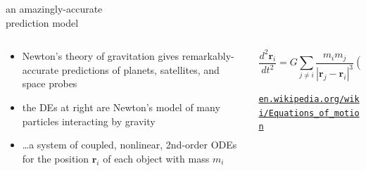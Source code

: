 \documentclass{beamer}
\begin{document}
\begin{frame}{an amazingly-accurate \\ prediction model}

\begin{columns}
\begin{column}{0.55\textwidth}
\begin{itemize}
\item Newton's theory of gravitation gives remarkably-accurate predictions of planets, satellites, and space probes
\item the DEs at right are Newton's model of many particles interacting by gravity
\item \dots a system of coupled, nonlinear, 2nd-order ODEs for the position $\mathbf{r}_i$ of each object with mass $m_i$
\end{itemize}
\end{column}
\begin{column}{0.45\textwidth}
$$\frac{d^2 \mathbf{r}_i}{dt^2} = G \sum_{j\ne i} \frac{m_i m_j}{|\mathbf{r}_j - \mathbf{r}_i|^3} (\mathbf{r}_j - \mathbf{r}_i)$$

\medskip

\quad \tiny \href{https://en.wikipedia.org/wiki/Equations_of_motion}{\texttt{en.wikipedia.org/wiki/Equations\_of\_motion}}
\end{column}
\end{columns}
\end{frame}
\end{document}
